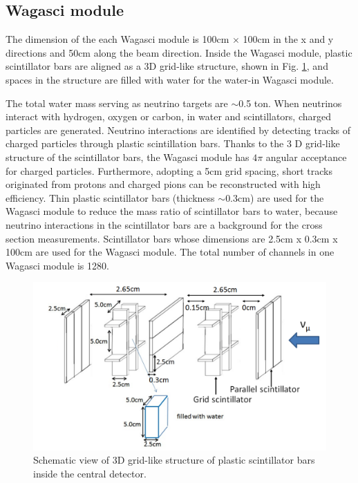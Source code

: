\subsection{Wagasci module}
The dimension of the each Wagasci module is 100cm $\times$ 100cm in the x and y directions
and 50cm along the beam direction.
Inside the Wagasci module, plastic scintillator bars are aligned as a 3D grid-like structure, shown in Fig. \ref{fig:3dgrid},
and spaces in the structure are filled with water for the water-in Wagasci module.

The total water mass serving as neutrino targets are $\sim$0.5 ton.
When neutrinos interact with hydrogen, oxygen or carbon, in water and scintillators,
charged particles are generated.
Neutrino interactions are identified by detecting tracks of charged particles through plastic scintillation bars.
Thanks to the 3 D grid-like structure of the scintillator bars, 
the Wagasci module has $4\pi$ angular acceptance for charged particles.
Furthermore, adopting a 5cm grid spacing, short tracks originated from protons and charged pions can be reconstructed
with high efficiency.
Thin plastic scintillator bars (thickness $\sim 0.3$cm) are used for the Wagasci module
to reduce  the mass ratio of scintillator bars to water,
because neutrino interactions in the scintillator bars are a background for the cross section measurements.
Scintillator bars whose dimensions are 2.5cm x 0.3cm x 100cm are used for the Wagasci module.
The total number of channels in one Wagasci module is 1280.

\begin{figure}[tbh]
\begin{center}
\includegraphics[width=1.0\linewidth]{fig/3d_grid_structure.pdf}
\end{center}
\caption{
Schematic view of 3D grid-like structure of plastic scintillator bars inside the central detector.
}
\label{fig:3dgrid}
\end{figure}

